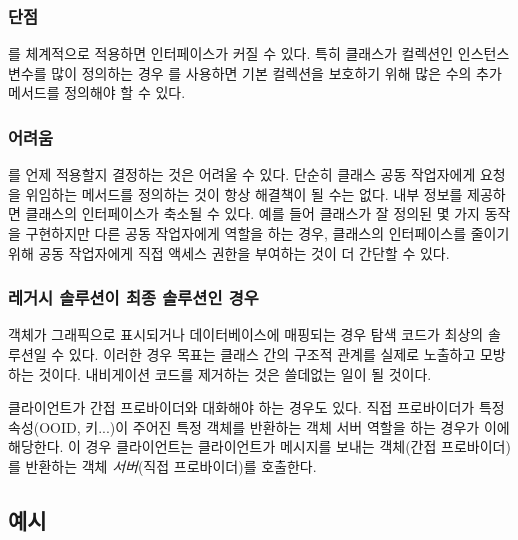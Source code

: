 \documentclass[a4paper,10pt,twoside]{book}
\begin{document}
\subsubsection*{단점}

\begin{bulletlist}
\item {}를 체계적으로 적용하면 인터페이스가 커질 수 있다. 특히 클래스가 컬렉션인 인스턴스 변수를 많이 정의하는 경우 를 사용하면 기본 컬렉션을 보호하기 위해 많은 수의 추가 메서드를 정의해야 할 수 있다. 
\end{bulletlist}

\subsubsection*{어려움}

\begin{bulletlist}
\item {}를 언제 적용할지 결정하는 것은 어려울 수 있다. 단순히 클래스 공동 작업자에게 요청을 위임하는 메서드를 정의하는 것이 항상 해결책이 될 수는 없다. 내부 정보를 제공하면 클래스의 인터페이스가 축소될 수 있다. 예를 들어 클래스가 잘 정의된 몇 가지 동작을 구현하지만 다른 공동 작업자에게  역할을 하는 경우, 클래스의 인터페이스를 줄이기 위해 공동 작업자에게 직접 액세스 권한을 부여하는 것이 더 간단할 수 있다.
\end{bulletlist}

\subsubsection*{레거시 솔루션이 최종 솔루션인 경우}

객체가 그래픽으로 표시되거나 데이터베이스에 매핑되는 경우 탐색 코드가 최상의 솔루션일 수 있다. 이러한 경우 목표는 클래스 간의 구조적 관계를 실제로 노출하고 모방하는 것이다. 내비게이션 코드를 제거하는 것은 쓸데없는 일이 될 것이다. 

클라이언트가 간접 프로바이더와 대화해야 하는 경우도 있다. 직접 프로바이더가 특정 속성(OOID, 키...)이 주어진 특정 객체를 반환하는 객체 서버 역할을 하는 경우가 이에 해당한다. 이 경우 클라이언트는 클라이언트가 메시지를 보내는 객체(간접 프로바이더)를 반환하는 객체 \emph{서버}(직접 프로바이더)를 호출한다. 

\subsection*{예시}
\end{document}
